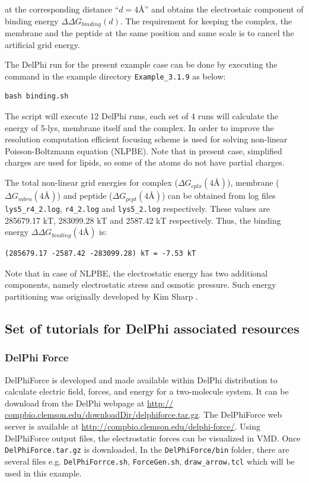 \documentclass[9pt,tutorial]{livecoms}
\begin{document}
at the corresponding distance ``$ d = 4 \text{\AA} $'' and obtains the electrostaic component of binding energy $ \Delta\Delta G_{binding}(d) $. The requirement for keeping the complex, the membrane and the peptide at the same position and same scale is to cancel the artificial grid energy.

The DelPhi run for the present example case can be done by executing the command in the example directory \texttt{Example\_3.1.9} as below:
\begin{verbatim}
bash binding.sh
\end{verbatim} 

The script will execute 12 DelPhi runs, each set of 4 runs will calculate the energy of 5-lys, membrane itself and the complex. In order to improve the resolution computation efficient focusing scheme is used for solving non-linear Poisson-Boltzmann equation (NLPBE). Note that in present case, simplified charges are used for lipids, so some of the atoms do not have partial charges.

The total non-linear grid energies for complex ($ \Delta G_{cplx}(4 \text{\AA}) $), membrane ($ \Delta G_{mbrn}(4 \text{\AA}) $) and peptide ($ \Delta G_{pept}(4 \text{\AA}) $) can be obtained from log files \texttt{lys5\_r4\_2.log}, \texttt{r4\_2.log} and \texttt{lys5\_2.log} respectively. These values are 285679.17 kT, 283099.28 kT and 2587.42 kT respectively. Thus, the binding energy $\Delta\Delta G_{binding}(4 \text{\AA}) $ is:

\begin{verbatim}
(285679.17 -2587.42 -283099.28) kT = -7.53 kT
\end{verbatim}

Note that in case of NLPBE, the electrostatic energy has two additional components, namely electrostatic stress and osmotic pressure. Such energy partitioning was originally developed by Kim Sharp \cite{sharp1990calculating}.

\subsection{Set of tutorials for DelPhi associated resources}

\subsubsection{DelPhi Force}

DelPhiForce\cite{li2017delphiforce} is developed and made available within DelPhi distribution to calculate electric field, forces, and energy for a two-molecule system. It can be download from the DelPhi webpage at \url{http:// compbio.clemson.edu/downloadDir/delphiforce.tar.gz}. The DelPhiForce web server is available at \url{http://compbio.clemson.edu/delphi-force/}. Using DelPhiForce output files, the electrostatic forces can be visualized in VMD\cite{humphrey1996vmd}. Once \texttt{DelPhiForce.tar.gz} is downloaded, In the \texttt{DelPhiForce/bin} folder, there are several files e.g. 
\texttt{DelPhiForrce.sh}, \texttt{ForceGen.sh}, \texttt{draw\_arrow.tcl} which will be used in this example.
\end{document}
